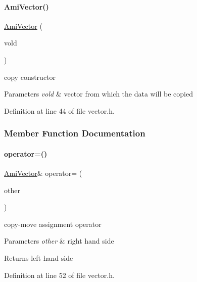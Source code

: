 \paragraph{\texorpdfstring{AmiVector()}{AmiVector()}\hspace{0.1cm}{\footnotesize\ttfamily [3/3]}}
{\footnotesize\ttfamily \mbox{\hyperlink{classamici_1_1_ami_vector}{Ami\+Vector}} (\begin{DoxyParamCaption}\item[{const \mbox{\hyperlink{classamici_1_1_ami_vector}{Ami\+Vector}} \&}]{vold }\end{DoxyParamCaption})}

copy constructor 
\begin{DoxyParams}{Parameters}
{\em vold} & vector from which the data will be copied \\
\hline
\end{DoxyParams}


Definition at line 44 of file vector.\+h.



\subsubsection{Member Function Documentation}
\mbox{\label{classamici_1_1_ami_vector_a6e52c4d61a7ea2d5bfb2f797aa8041ec}} 
\paragraph{\texorpdfstring{operator=()}{operator=()}}
{\footnotesize\ttfamily \mbox{\hyperlink{classamici_1_1_ami_vector}{Ami\+Vector}}\& operator= (\begin{DoxyParamCaption}\item[{\mbox{\hyperlink{classamici_1_1_ami_vector}{Ami\+Vector}} const \&}]{other }\end{DoxyParamCaption})}

copy-\/move assignment operator 
\begin{DoxyParams}{Parameters}
{\em other} & right hand side \\
\hline
\end{DoxyParams}
\begin{DoxyReturn}{Returns}
left hand side 
\end{DoxyReturn}


Definition at line 52 of file vector.\+h.

